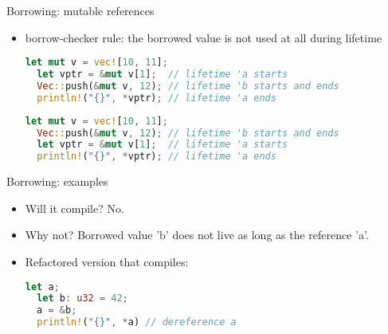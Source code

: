 \documentclass{beamer}
\begin{document}
\begin{frame}[fragile]{Borrowing: mutable references}
\begin{itemize}
  \item borrow-checker rule: the borrowed value is not used at all during lifetime

  \begin{lstlisting}[language=Rust]
  let mut v = vec![10, 11];
  let vptr = &mut v[1];  // lifetime 'a starts
  Vec::push(&mut v, 12); // lifetime 'b starts and ends
  println!("{}", *vptr); // lifetime 'a ends
  \end{lstlisting}
  \pause
  \begin{lstlisting}[language=Rust]
  let mut v = vec![10, 11];
  Vec::push(&mut v, 12); // lifetime 'b starts and ends
  let vptr = &mut v[1];  // lifetime 'a starts
  println!("{}", *vptr); // lifetime 'a ends
  \end{lstlisting}
\end{itemize}
\end{frame}


\begin{frame}[fragile]{Borrowing: examples}
\begin{itemize}
  \begin{lstlisting}[language=Rust]
  let a;
  {
    let b: u32 = 42;
    a = &b;
  }
  println!("{}", *a) // dereference a
  \end{lstlisting}

  \item Will it compile? \pause No.
  \item Why not? Borrowed value 'b' does not live as long as the reference 'a'.
  \item Refactored version that compiles:\pause

  \begin{lstlisting}[language=Rust]
  let a;
  let b: u32 = 42;
  a = &b;
  println!("{}", *a) // dereference a
  \end{lstlisting}
\end{itemize}
\end{frame}
\end{document}
